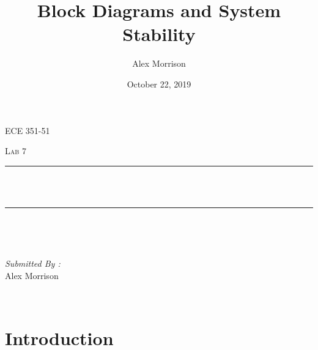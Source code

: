 \documentclass[12pt]{report}
\title{Block Diagrams and System Stability}
\author{ Alex Morrison}
\date{October 22, 2019}
\makeatletter
\let\thetitle\@title
\makeatother
\begin{document}

\begin{titlepage}
	\centering
    \vspace*{0.5 cm}
\begin{center}    \textsc{\Large ECE 351-51}\\[2.0 cm]	\end{center}%
	\textsc{\Large  Lab 7}\\[0.5 cm]				%
	\rule{\linewidth}{0.2 mm} \\[0.4 cm]
	{ \huge \bfseries \thetitle}\\
	\rule{\linewidth}{0.2 mm} \\[1.5 cm]
	
	\begin{minipage}{0.4\textwidth}
		\begin{flushleft} \large
			\end{flushleft}
			\end{minipage}~
			\begin{minipage}{0.4\textwidth}
            
			\begin{flushright} \large
			\emph{Submitted By :} \\
			Alex Morrison  
		\end{flushright}
           
	\end{minipage}\\[2 cm]
	

    
    
    
    
	
\end{titlepage}


\tableofcontents
\pagebreak

\renewcommand{\thesection}{\arabic{section}}
\section{Introduction}
 
\end{document}
